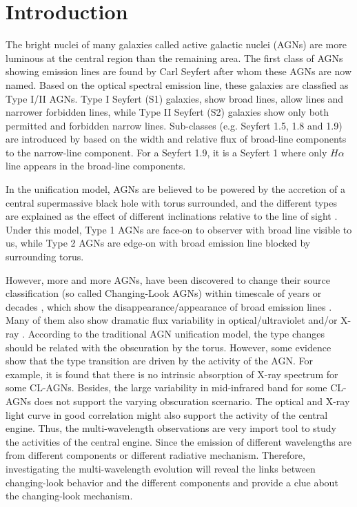 \documentclass[twocolumn]{aastex63}
\begin{document}
\section{Introduction}\label{sec:intro} 

The bright nuclei of many galaxies called active galactic nuclei (AGNs) are more luminous at the central region than the remaining area. The first class of AGNs showing emission lines are found by Carl Seyfert after whom these AGNs are now named. Based on the optical spectral emission line, these galaxies are classfied as Type I/II AGNs. Type I Seyfert (S1) galaxies, show broad lines, allow lines and narrower forbidden lines, while Type II Seyfert (S2) galaxies show only both permitted and forbidden narrow lines. Sub-classes (e.g. Seyfert 1.5, 1.8 and 1.9) are introduced by \citet{1976MNRAS.176P..61O,1981ApJ...249..462O} based on the width and relative flux of broad-line components to the narrow-line component. For a Seyfert 1.9, it is a Seyfert 1 where only $H\alpha$ line appears in the broad-line components. 

In the unification model, AGNs are believed to be powered by the accretion of a central supermassive black hole with torus surrounded, and the different types are explained as the effect of different inclinations relative to the line of sight \citep[see][]{1993ARA&A..31..473A}. Under this model, Type 1 AGNs are face-on to observer with broad line visible to us, while Type 2 AGNs are edge-on with broad emission line blocked by surrounding torus.


{However, more and more AGNs, have been discovered to change their source classification (so called Changing-Look AGNs) within timescale of years or decades \citep[e.g.][]{2016MNRAS.457..389M, 2016ApJ...826..188R, 2018ApJ...864...27S, 2019ApJ...874....8M,2020MNRAS.491.4925G}, 
which show the disappearance/appearance of broad emission lines \citep[e.g.][]{2016MNRAS.457..389M,?}. Many of them also show dramatic flux variability in optical/ultraviolet and/or X-ray \citep[e.g.][]{2017ApJ...846L...7S,?}. According to the traditional AGN unification model, the type changes should be related with the obscuration by the torus. However, some evidence show that the type transition are driven by the activity of the AGN. For example, it is found that there is no intrinsic absorption of X-ray spectrum for some CL-AGNs. Besides, the large variability in mid-infrared band for some CL-AGNs\citep[e.g.][]{2017ApJ...846L...7S} does not support the varying obscuration scernario. The optical and X-ray light curve in good correlation might also support the activity of the central engine. Thus, the multi-wavelength observations are very import tool to study the activities of the central engine. Since the emission of different wavelengths are from different components or different radiative mechanism. %
Therefore, investigating the multi-wavelength evolution will reveal the links between changing-look behavior and the different components and provide a clue about the changing-look mechanism.}
\end{document}
